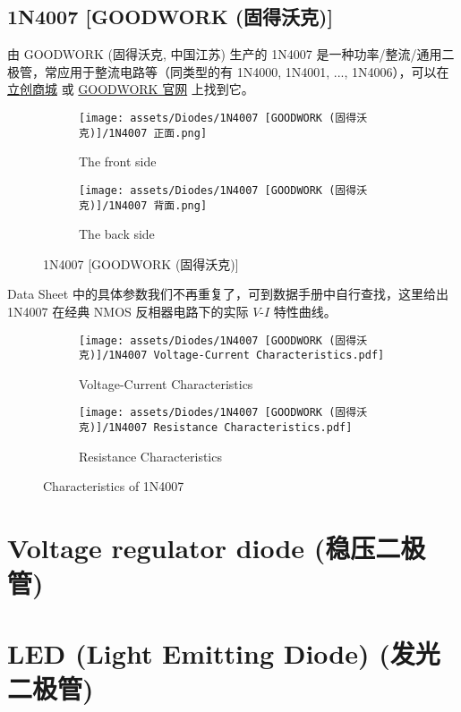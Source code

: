 \documentclass[UTF8]{report}
\begin{document}
\subsection{1N4007 [GOODWORK (固得沃克)]}

由 GOODWORK (固得沃克, 中国江苏) 生产的 1N4007 是一种功率/整流/通用二极管，常应用于整流电路等（同类型的有 1N4000, 1N4001, ..., 1N4006），可以在 \href{https://item.szlcsc.com/3428711.html}{立创商城} 或 \href{http://www.gk-goodwork.com/cn/product/1n4007.html}{GOODWORK 官网} 上找到它。
\begin{figure}[H]\centering
\begin{subfigure}[b]{0.5\columnwidth}\centering
    \texttt{[image: assets/Diodes/1N4007 [GOODWORK (固得沃克)]/1N4007 正面.png]}
    \caption{The front side}
\end{subfigure}\hfill
\begin{subfigure}[b]{0.5\columnwidth}\centering
    \texttt{[image: assets/Diodes/1N4007 [GOODWORK (固得沃克)]/1N4007 背面.png]}
    \caption{The back side}
\end{subfigure}
\caption{1N4007 [GOODWORK (固得沃克)]}
\end{figure}

Data Sheet 中的具体参数我们不再重复了，可到数据手册中自行查找，这里给出 1N4007 在经典 NMOS 反相器电路下的实际 $V$-$I$ 特性曲线。

\begin{figure}[H]\centering
\begin{subfigure}[b]{0.5\columnwidth}\centering
    \texttt{[image: assets/Diodes/1N4007 [GOODWORK (固得沃克)]/1N4007 Voltage-Current Characteristics.pdf]}
    \caption{Voltage-Current Characteristics}
\end{subfigure}\hfill
\begin{subfigure}[b]{0.5\columnwidth}\centering
    \texttt{[image: assets/Diodes/1N4007 [GOODWORK (固得沃克)]/1N4007 Resistance Characteristics.pdf]}
    \caption{Resistance Characteristics}
\end{subfigure}
\caption{Characteristics of 1N4007}
\end{figure}





\section{Voltage regulator diode (稳压二极管)}
\section{LED (Light Emitting Diode) (发光二极管)}
\end{document}
